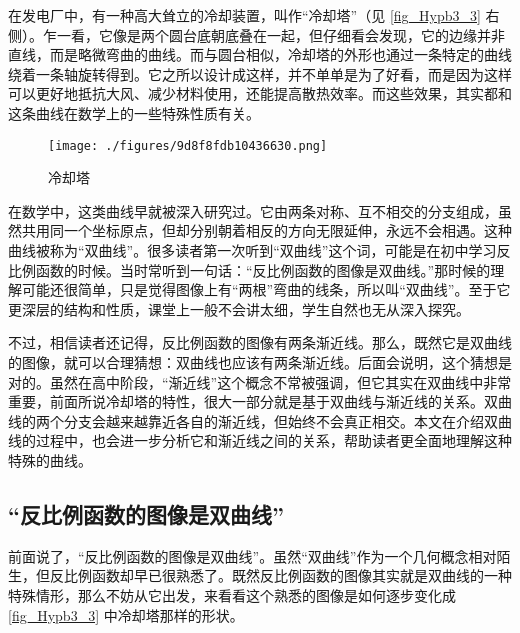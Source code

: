 
\begin{issues}
\issueDraft
\end{issues}


在发电厂中，有一种高大耸立的冷却装置，叫作“冷却塔”（见 \autoref{fig_Hypb3_3} 右侧）。乍一看，它像是两个圆台底朝底叠在一起，但仔细看会发现，它的边缘并非直线，而是略微弯曲的曲线。而与圆台相似，冷却塔的外形也通过一条特定的曲线绕着一条轴旋转得到。它之所以设计成这样，并不单单是为了好看，而是因为这样可以更好地抵抗大风、减少材料使用，还能提高散热效率。而这些效果，其实都和这条曲线在数学上的一些特殊性质有关。

\begin{figure}[ht]
\centering
\texttt{[image: ./figures/9d8f8fdb10436630.png]}
\caption{冷却塔} \label{fig_Hypb3_3}
\end{figure}

在数学中，这类曲线早就被深入研究过。它由两条对称、互不相交的分支组成，虽然共用同一个坐标原点，但却分别朝着相反的方向无限延伸，永远不会相遇。这种曲线被称为“双曲线”。很多读者第一次听到“双曲线”这个词，可能是在初中学习反比例函数的时候。当时常听到一句话：“反比例函数的图像是双曲线。”那时候的理解可能还很简单，只是觉得图像上有“两根”弯曲的线条，所以叫“双曲线”。至于它更深层的结构和性质，课堂上一般不会讲太细，学生自然也无从深入探究。

不过，相信读者还记得，反比例函数的图像有两条渐近线。那么，既然它是双曲线的图像，就可以合理猜想：双曲线也应该有两条渐近线。后面会说明，这个猜想是对的。虽然在高中阶段，“渐近线”这个概念不常被强调，但它其实在双曲线中非常重要，前面所说冷却塔的特性，很大一部分就是基于双曲线与渐近线的关系。双曲线的两个分支会越来越靠近各自的渐近线，但始终不会真正相交。本文在介绍双曲线的过程中，也会进一步分析它和渐近线之间的关系，帮助读者更全面地理解这种特殊的曲线。

\subsection{“反比例函数的图像是双曲线”}

前面说了，“反比例函数的图像是双曲线”。虽然“双曲线”作为一个几何概念相对陌生，但反比例函数却早已很熟悉了。既然反比例函数的图像其实就是双曲线的一种特殊情形，那么不妨从它出发，来看看这个熟悉的图像是如何逐步变化成 \autoref{fig_Hypb3_3} 中冷却塔那样的形状。

